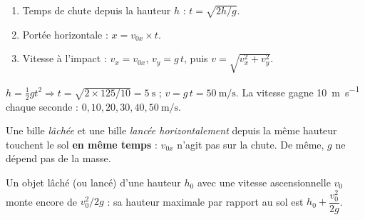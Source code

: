 \documentclass[11pt,a4paper]{article}
\begin{document}
\begin{methode}
\begin{enumerate}[label=\arabic*.,leftmargin=1.6em,topsep=1pt,itemsep=0pt]
  \item Temps de chute depuis la hauteur $h$ : $t=\sqrt{2h/g}$.
  \item Portée horizontale : $x=v_{0x}\times t$.
  \item Vitesse à l'impact : $v_x=v_{0x}$, $v_y=g\,t$, puis $v=\sqrt{v_x^2+v_y^2}$.
\end{enumerate}
\end{methode}

\begin{exemplebox}
$h=\tfrac12 g t^2 \Rightarrow t=\sqrt{2\times125/10}=\qty{5}{\second}$ ; $v=g\,t=\qty{50}{\metre\per\second}$.
La vitesse gagne \qty{10}{\metre\per\second} chaque seconde : $0,10,20,30,40,\qty{50}{\metre\per\second}$.
\end{exemplebox}

\begin{piege}
Une bille \emph{lâchée} et une bille \emph{lancée horizontalement} depuis la même hauteur touchent
le sol \textbf{en même temps} : $v_{0x}$ n'agit pas sur la chute. De même, $g$ ne dépend pas de la masse.
\end{piege}

\begin{remarque}
Un objet lâché (ou lancé) d'une hauteur $h_0$ avec une vitesse ascensionnelle $v_0$ monte encore de
$v_0^2/2g$ : sa hauteur maximale par rapport au sol est $h_0+\dfrac{v_0^2}{2g}$.
\end{remarque}
\end{document}
